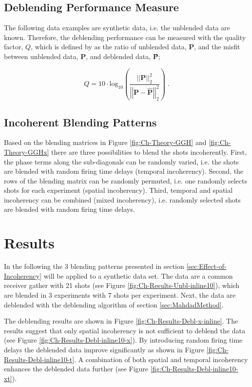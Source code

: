 \subsection*{Deblending Performance Measure}

The following data examples are synthetic data, i.e. the unblended data are known. Therefore, the deblending performance can be measured with the quality factor, $Q$, which is defined by \citet{IbrahimQuality} as the ratio of unblended data, $\mathbf{P}$, and the misfit between unblended data, $\mathbf{P}$, and deblended data, \textbf{\^{P}};

\begin{equation}
	Q = 10 \cdot \mathrm{log_{10}} \left( \frac{\left|\left|\mathbf{P}\right|\right| _2 ^2}{\left|\left|\mathbf{P - \hat{P}}\right|\right| _2 ^2} \right) \;.	
\end{equation}


\subsection*{Incoherent Blending Patterns}

Based on the blending matrices in Figure \ref{fig:Ch-Theory-GGH} and \ref{fig:Ch-Theory-GGHx} there are three possibilities to blend the shots incoherently. First, the phase terms along the sub-diagonals can be randomly varied, i.e. the shots are blended with random firing time delays (temporal incoherency). Second, the rows of the blending matrix can be randomly permuted, i.e. one randomly selects shots for each experiment (spatial incoherency). Third, temporal and spatial incoherency can be combined (mixed incoherency), i.e. randomly selected shots are blended with random firing time delays.



\section{Results}

In the following the 3 blending patterns presented in section \ref{sec:Effect-of-Incoherency} will be applied to a synthetic data set. The data are a common receiver gather with 21 shots (see Figure \ref{fig:Ch-Results-Unbl-inline10}), which are blended in 3 experiments with 7 shots per experiment. Next, the data are deblended with the deblending algorithm of section \ref{sec:MahdadMethod}. 

The deblending results are shown in Figure \ref{fig:Ch-Results-Debl-x-inline}. The results suggest that only spatial incoherency is not sufficient to deblend the data (see Figure \ref{fig:Ch-Results-Debl-inline10-x}). By introducing random firing time delays the deblended data improve significantly as shown in Figure \ref{fig:Ch-Results-Debl-inline10-t}. A combination of both spatial and temporal incoherency enhances the deblended data further (see Figure \ref{fig:Ch-Results-Debl-inline10-xt}).


